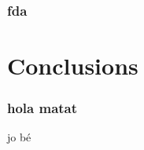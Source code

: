 \documentclass{beamer}
\begin{document}
\begin{frame}
	\frametitle{fda}
\end{frame}
\section{Conclusions} %
\label{sec:Conclusions}
\begin{frame}

\end{frame}

\subsubsection{hola matat} %
\label{ssub:hola matat}
\begin{frame}
	jo bé
\end{frame}


\end{document}
